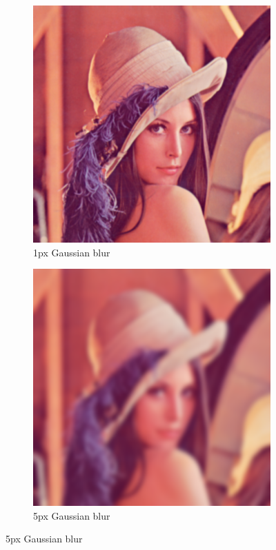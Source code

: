\begin{figure}[ht]
\begin{subfigure}[b]{0.3\textwidth}
                \includegraphics[scale=0.25]{diagrams/Lenna-blur1}
                \caption{1px Gaussian blur}
       \end{subfigure}
       \begin{subfigure}[b]{0.3\textwidth}
                \includegraphics[scale=0.25]{diagrams/Lenna-blur5}
                \caption{5px Gaussian blur}
       \end{subfigure}
\end{figure}


